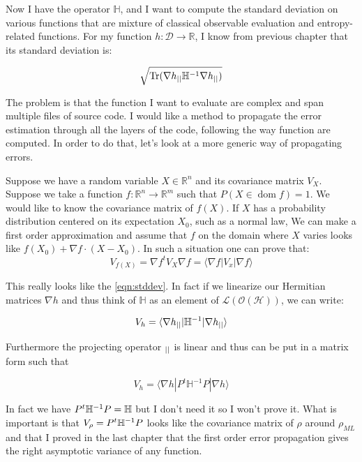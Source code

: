 \documentclass[10pt,a4paper]{report}
\theoremstyle{plain}
\theoremstyle{definition}
\theoremstyle{remark}
\newcommand{\R}{\ensuremath{\mathbb{R}}}
\newcommand{\ket}[1]{|#1\rangle}
\newcommand{\bra}[1]{\langle#1|}
\DeclareMathOperator{\Tr}{Tr}
\DeclareMathOperator{\dom}{dom}
\newcommand{\ml}{_{M\!L}}
\begin{document}
Now I have the operator $\mathbb H$, and I want to compute the standard
deviation on various functions that are mixture of classical observable
evaluation and entropy-related functions. For my function $h: \mathcal{D} \to
\R$, I know from previous chapter that its standard deviation is:

\begin{equation}\label{eqn:stddev}
  \sqrt{\Tr(\nabla h\pr\mathbb H\inv \nabla h\pr)}
\end{equation}

The problem is that the function I want to evaluate are complex and span
multiple files of source code. I would like a method to propagate the error
estimation through all the layers of the code, following the way function are
computed. In order to do that, let's look at a more generic way of propagating
errors.

Suppose we have a random variable $X \in \R^n$ and its covariance matrix $V_X$.
Suppose we take a function $f : \R^n \to \R^m$ such that $P(X \in \dom f) = 1$.
We would like to know the covariance matrix of $f(X)$.
If $X$ has a probability distribution centered on its expectation $X_0$, such as
a normal law, We can make a first order approximation and assume that $f$ on the
domain where $X$ varies looks like $f(X_0) + \nabla f \cdot (X-X_0)$. In such a
situation one can prove that:
\begin{equation}\label{eqn:propag}
  V_{f(X)} = \nabla f^t V_X \nabla f = \bra {\nabla f} V_x \ket {\nabla f}
\end{equation}


This really looks like the \cref{eqn:stddev}. In fact if we linearize our
Hermitian matrices $\nabla h$
and thus think of $\mathbb H$ as an element of
$\mathcal{L}(\mathcal{O}(\mathcal{H}))$, we can write:

\[V_h = \bra {\nabla h\pr} \mathbb H^{-1} \ket{\nabla h\pr}\]

Furthermore the projecting operator $_{||}$ is linear and thus can be put in a
matrix form such that

\[V_h = \bra{\nabla h}P^t\mathbb H^{-1}P \ket{\nabla h}\]

In fact we have $P^t \mathbb H^{-1} P = \mathbb H$ but I don't need it so I
won't prove it. What is important is that $V_\rho = P^t \mathbb H^{-1} P$ looks
like the covariance matrix of $\rho$ around $\rho\ml$ and that I proved in the last chapter
that the first order error propagation gives the right asymptotic variance of
any function.
\end{document}

